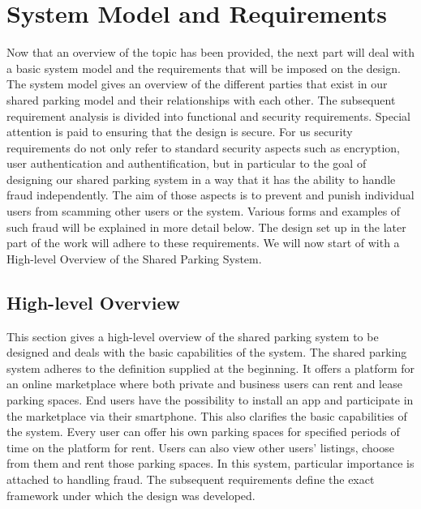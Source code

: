 \documentclass[
a4paper,     %
titlepage,   %
14pt         %
]{scrartcl}  %
\theoremstyle{mystyle}
\begin{document}
\section{System Model and Requirements}
Now that an overview of the topic has been provided, the next part will deal with a basic system model and the requirements that will be imposed on the design. The system model gives an overview of the different parties that exist in our shared parking model and their relationships with each other. The subsequent requirement analysis is divided into functional and security requirements. Special attention is paid to ensuring that the design is secure. For us security requirements do not only refer to standard security aspects such as encryption, user authentication and authentification, but in particular to the goal of designing our shared parking system in a way that it has the ability to handle fraud independently. The aim of those aspects is to prevent and punish individual users from scamming other users or the system. Various forms and examples of such fraud will be explained in more detail below. The design set up in the later part of the work will adhere to these requirements. We will now start of with a High-level Overview of the Shared Parking System.

\subsection{High-level Overview}
This section gives a high-level overview of the shared parking system to be designed and deals with the basic capabilities of the system. The shared parking system adheres to the definition supplied at the beginning. It offers a platform for an online marketplace where both private and business users can rent and lease parking spaces. End users have the possibility to install an app and participate in the marketplace via their smartphone. This also clarifies the basic capabilities of the system. Every user can offer his own parking spaces for specified periods of time on the platform for rent. Users can also view other users' listings, choose from them and rent those parking spaces. In this system, particular importance is attached to handling fraud. The subsequent requirements define the exact framework under which the design was developed. 
\end{document}
